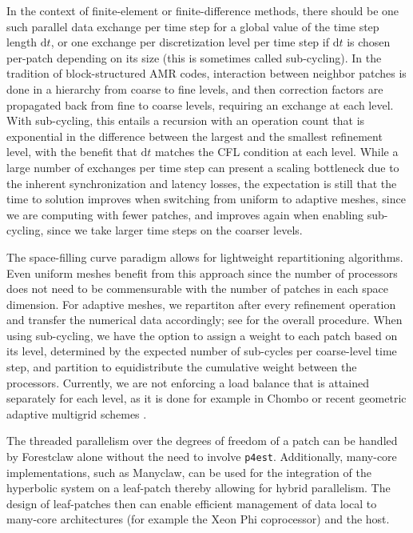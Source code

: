 \documentclass{IOS-Book-Article}     %
\newcommand{\dt}{\mathrm{d}t}
\newcommand{\forestclaw}{Forestclaw\xspace}
\newcommand{\pforest}{\texttt{p4est}\xspace}
\newcommand{\manyclaw}{Manyclaw\xspace}
\begin{document}
In the context of finite-element or finite-difference methods, there should be
one such parallel data exchange per time step for a global value of the time
step length $\dt$, or one exchange per discretization level per time step if
$\dt$ is chosen per-patch depending on its size (this is sometimes called
sub-cycling).  In the tradition of block-structured AMR codes, interaction
between neighbor patches is done in a hierarchy from coarse to fine levels, and
then correction factors are propagated back from fine to coarse levels, requiring
an exchange at each level.  With sub-cycling, this entails a recursion with an
operation count that is exponential in the difference between the largest and
the smallest refinement level, with the benefit that $\dt$ matches the CFL
condition at each level.  While a large number of exchanges per time step can
present a scaling bottleneck due to the inherent synchronization and latency
losses, the expectation is still that the time to solution improves when
switching from uniform to adaptive meshes, since we are computing with fewer
patches, and improves again when enabling sub-cycling, since we take larger
time steps on the coarser levels.

The space-filling curve paradigm allows for lightweight repartitioning
algorithms.  Even uniform meshes benefit from this approach since the number of
processors does not need to be commensurable with the number of patches in each
space dimension.  For adaptive meshes, we repartiton after every refinement
operation and transfer the numerical data accordingly; see \cite[Fig.\
4]{BursteddeGhattasStadlerEtAl08} for the overall procedure.  When using
sub-cycling, we have the option to assign a weight to each patch based on its
level, determined by the expected number of sub-cycles per coarse-level time
step, and partition to equidistribute the cumulative weight between the
processors.  Currently, we are not enforcing a load balance that is attained
separately for each level, as it is done for example in Chombo
\cite{ColellaGravesKeenEtAl07} or recent geometric adaptive multigrid schemes
\cite{SundarBirosBursteddeEtAl12}.

The threaded parallelism over the degrees of freedom of a patch can be handled
by \forestclaw alone without the need to involve \pforest.  Additionally,
many-core implementations, such as \manyclaw \cite{manyclaw}, can be used for
the integration of the hyperbolic system on a leaf-patch thereby allowing for
hybrid parallelism.  The design of leaf-patches then can enable efficient
management of data local to many-core architectures (for example the Xeon Phi
coprocessor) and the host.
\end{document}
